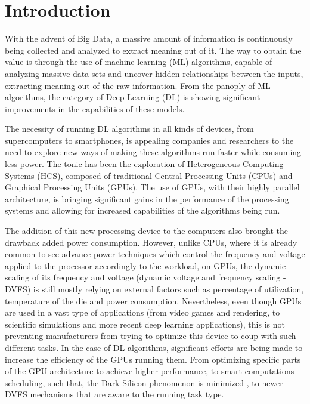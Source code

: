 
\chapter{Introduction}
\label{chapter:introduction}

With the advent of Big Data, a massive amount of information is continuously being collected and analyzed to extract meaning out of it. The way to obtain the value is through the use of machine learning (ML) algorithms, capable of analyzing massive data sets and uncover hidden relationships between the inputs, extracting meaning out of the raw information. From the panoply of ML algorithms, the category of Deep Learning (DL) is showing significant improvements in the capabilities of these models. 

The necessity of running DL algorithms in all kinds of devices, from supercomputers to smartphones, is appealing companies and researchers to the need to explore new ways of making these algorithms run faster while consuming less power. The tonic has been the exploration of Heterogeneous Computing Systems (HCS), composed of traditional Central Processing Units (CPUs) and Graphical Processing Units (GPUs). The use of GPUs, with their highly parallel architecture, is bringing significant gains in the performance of the processing systems and allowing for increased capabilities of the algorithms being run. 

The addition of this new processing device to the computers also brought the drawback added power consumption. However, unlike CPUs, where it is already common to see advance power techniques which control the frequency and voltage applied to the processor accordingly to the workload, on GPUs, the dynamic scaling of its frequency and voltage (dynamic voltage and frequency scaling - DVFS) is still mostly relying on external factors such as percentage of utilization, temperature of the die and power consumption. Nevertheless, even though GPUs are used in a vast type of applications (from video games and rendering, to scientific simulations and more recent deep learning applications), this is not preventing manufacturers from trying to optimize this device to coup with such different tasks. In the case of DL algorithms, significant efforts are being made to increase the efficiency of the GPUs running them. From optimizing specific parts of the GPU architecture to achieve higher performance, to smart computations scheduling, such that, the Dark Silicon phenomenon is minimized \cite{esmaeilzadeh_dark_2011}, to newer DVFS mechanisms that are aware to the running task type. 

